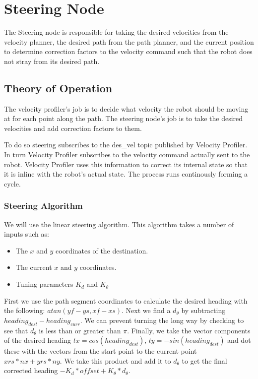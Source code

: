 \section{Steering Node}

The Steering node is responsible for taking the desired velocities from
the velocity planner, the desired path from the path planner, and the
current position to determine correction factors to the velocity command
such that the robot does not stray from its desired path.

\subsection{Theory of Operation}

The velocity profiler's job is to decide what velocity the robot
should be moving at for each point along the path.  The steering
node's job is to take the desired velocities and add correction
factors to them.

To do so steering subscribes to the des\_vel topic published by
Velocity Profiler.  In turn Velocity Profiler subscribes to the
velocity command actually sent to the robot. Velocity Profiler uses
this information to correct its internal state so that it is inline
with the robot's actual state.  The process runs continously forming a
cycle.

\subsubsection{Steering Algorithm}

We will use the linear steering algorithm. This algorithm takes a number
of inputs such as:

\begin{itemize}
\item
  The $x$ and $y$ coordinates of the destination.
\item
  The current $x$ and $y$ coordinates.
\item
  Tuning parameters $K_d$ and $K_\theta$
\end{itemize}
First we use the path segment coordinates to calculate the desired
heading with the following: $atan(yf-ys,xf-xs)$. Next we find a
$d_\theta$ by subtracting $heading_{dest}-heading_{curr}$. We can
prevent turning the long way by checking to see that $d_\theta$ is less
than or greater than $\pi$. Finally, we take the vector components of
the desired heading $tx=cos(heading_{dest})$, $ty=-sin(heading_{dest})$
and dot these with the vectors from the start point to the current point
$xrs*nx+yrs*ny$. We take this product and add it to $d_\theta$ to get
the final corrected heading $-K_d*offset+K_{\theta}*d_\theta$.

